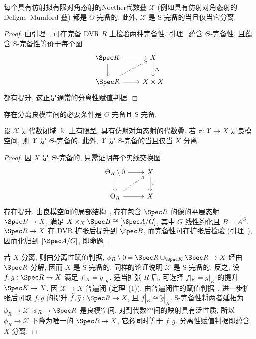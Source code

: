 \begin{proposition}\label{src:7.9.22}
每个具有仿射拟有限对角态射的Noether代数叠 $\mathcal X$ (例如具有仿射对角态射的 Deligne--Mumford 叠) 都是 $\Theta$-完备的. 此外, $\mathcal X$ 是 S-完备的当且仅当它分离.
\end{proposition}
\begin{proof}
由引理~, 可在完备 DVR $R$ 上检验两种完备性. 引理~ 蕴含 $\Theta$-完备性, 且蕴含 S-完备性等价于每个图
\[\begin{tikzcd}[ampersand replacement=\&]\Spec K\arrow[r]\arrow[d]\&\mathcal X\arrow[d,"{\Delta}"]\\\Spec R\arrow[r]\arrow[ur,dashed]\&\mathcal X\times\mathcal X\end{tikzcd}\]
都有提升, 这正是通常的分离性赋值判据.
\end{proof}
存在分离良模空间的必要条件是 $\Theta$-完备且 S-完备.
\begin{proposition}\label{src:7.9.23}
设 $\mathcal X$ 是代数闭域 $\Bbbk$ 上有限型, 具有仿射对角态射的代数叠. 若 $\pi:\mathcal X\to X$ 是良模空间, 则 $\mathcal X$ 是 $\Theta$-完备的. 此外, $\mathcal X$ 是 S-完备的当且仅当 $X$ 分离.
\end{proposition}
\begin{proof}
因 $X$ 是 $\Theta$-完备的, 只需证明每个实线交换图
\[\begin{tikzcd}[ampersand replacement=\&]\Theta_R\setminus0\arrow[r]\arrow[d]\&\mathcal X\arrow[d,"{\pi}"]\\\Theta_R\arrow[r]\arrow[ur,dashed]\&X\end{tikzcd}\]
存在提升. 由良模空间的局部结构~, 存在包含 $\Spec R$ 的像的平展态射 $\Spec B\to X$, 满足 $\mathcal X\times_X\Spec B\cong[\Spec A/G]$, 其中 $G$ 线性约化且 $B=A^G$. $\Spec R\to X$ 在 DVR 扩张后提升到 $\Spec B$, 而完备性可在扩张后检验 (引理~), 因而化归到 $[\Spec A/G]$, 即命题~.

若 $X$ 分离, 则由分离性赋值判据, $\phi_R\setminus0=\Spec R\cup_{\Spec K}\Spec R\to X$ 经由 $\Spec R$ 分解, 因而 $X$ 是 S-完备的. 同样的论证说明 $\mathcal X$ 是 S-完备的. 反之, 设 $f,g:\Spec R\to X$ 满足 $f|_K=g|_K$. 适当扩张 $R$ 后, 可选择 $f|_K=g|_K$ 的提升 $\Spec K\to\mathcal X$. 因 $\mathcal X\to X$ 普遍闭 (定理~(1)), 由普遍闭性的赋值判据~, 进一步扩张后可取 $f,g$ 的提升 $\widetilde f,\widetilde g:\Spec R\to X$, 且 $\widetilde f|_K\cong\widetilde g|_K$. S-完备性将两者延拓为 $\phi_R\to\mathcal X$. $\phi_R\to\Spec R$ 是良模空间, 对到代数空间的映射具有泛性质, 所以 $\phi_R\to\mathcal X$ 下降为唯一的 $\Spec R\to X$, 它必同时等于 $f,g$. 分离性赋值判据即蕴含 $X$ 分离.
\end{proof}
